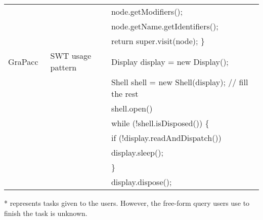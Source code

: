 \begin{table*}[ht]
\begin{center}
{\begin{tabular*}{1\textwidth}{@{}l|l|l@{}}
&& node.getModifiers();\\
&& node.getName.getIdentifiers();\\
&& return super.visit(node); \} \\ \hline
 GraPacc~\cite{Nguyen:GraPaccICSE12}&SWT usage pattern&Display display = new Display();\\
 && Shell shell = new Shell(display); // fill the rest\\
 && shell.open()\\
 && while (!shell.isDisposed()) \{\\
 &&  if (!display.readAndDispatch())\\
 &&   display.sleep();\\
 && \}\\
 && display.dispose();\\ \hline
 
\end{tabular*}
 \label{tab:concern}
 
* represents tasks given to the users. However, the free-form query users use to finish the task is unknown.
}

 \end{center}
\end{table*}


